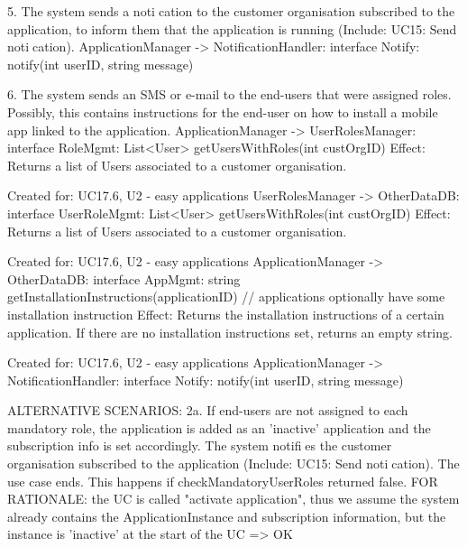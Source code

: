 {{{            5. The system sends a notication to the customer organisation subscribed to the application, to inform them that the application is running (Include: UC15: Send notication).
                ApplicationManager -> NotificationHandler: interface Notify: notify(int userID, string message)

            6. The system sends an SMS or e-mail to the end-users that were assigned roles. Possibly, this contains instructions for the end-user on how to install a mobile app linked to the application.
                ApplicationManager -> UserRolesManager:    interface RoleMgmt:     List<User> getUsersWithRoles(int custOrgID)
                    Effect: Returns a list of Users associated to a customer organisation.
                    \item Created for: UC17.6, U2 - easy applications
                UserRolesManager -> OtherDataDB:           interface UserRoleMgmt: List<User> getUsersWithRoles(int custOrgID)
                    Effect: Returns a list of Users associated to a customer organisation.
                    \item Created for: UC17.6, U2 - easy applications
                ApplicationManager -> OtherDataDB:         interface AppMgmt:      string getInstallationInstructions(applicationID) // applications optionally have some installation instruction
                    Effect: Returns the installation instructions of a certain application. If there are no installation instructions set, returns an empty string.
                    \item Created for: UC17.6, U2 - easy applications
                ApplicationManager -> NotificationHandler: interface Notify:       notify(int userID, string message)

            ALTERNATIVE SCENARIOS:
                2a. If end-users are not assigned to each mandatory role, the application is added as an 'inactive'
                application and the subscription info is set accordingly. The system notifies the customer
                organisation subscribed to the application (Include: UC15: Send notication). The use case ends.
                    This happens if checkMandatoryUserRoles returned false.
                    FOR RATIONALE: the UC is called "activate application", thus we assume the system already contains the
                                   ApplicationInstance and subscription information, but the instance is 'inactive' at the start of the UC
                    => OK

}}}
